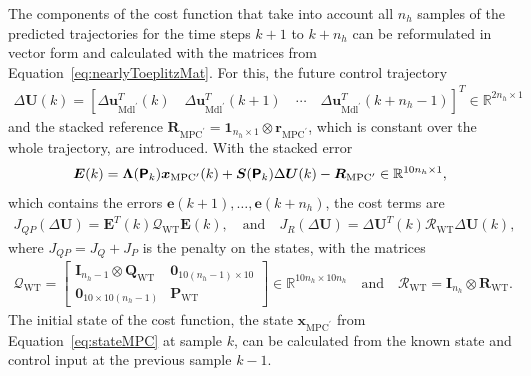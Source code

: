 The components of the cost function that take into account all $n_h$ samples of the predicted trajectories for the time steps $k+1$ to $k + n_h$ can be reformulated in vector form and calculated with the matrices from Equation~\eqref{eq:nearlyToeplitzMat}. For this, the future control trajectory
\begin{align*}
    \Delta \bm{U}(k) = \left[\Delta \bm{u}_{\text{Mdl}^\prime}^T(k) \quad \Delta \bm{u}_{\text{Mdl}^\prime}^T(k+1) \quad \cdots \quad \Delta \bm{u}_{\text{Mdl}^\prime}^T(k+ n_h -1) \right]^T \in \mathbb{R}^{2n_h \times 1}
\end{align*}
and the stacked reference $\bm{R}_{\text{MPC}^\prime} = \bm{1}_{n_h \times 1}\otimes \bm{r}_{\text{MPC}^\prime}$, which is constant over the whole trajectory, are introduced. With the stacked error
\begin{align*}
    \bm{E}(k) = \bm{\Lambda}(\bm{\mathsf{P}}_k)\bm{x}_{\text{MPC}^\prime}(k) + \bm{S}(\bm{\mathsf{P}}_k) \Delta \bm{U}(k) - \bm{R}_{\text{MPC}^\prime} \in \mathbb{R}^{10 n_h \times 1},
\end{align*}
which contains the errors $\bm{e}(k+1), \dots, \bm{e}(k+n_h)$, the cost terms are
\begin{align*}
    J_{QP}(\Delta \bm{U}) = \bm{E}^T(k) \bm{\mathcal{Q}}_{\text{WT}} \bm{E}(k),\quad \text{and} \quad
    J_R(\Delta \bm{U}) = \Delta \bm{U}^T(k) \bm{\mathcal{R}}_{\text{WT}} \Delta \bm{U}(k),
\end{align*}
where $J_{QP} = J_Q + J_P$ is the penalty on the states, with the matrices
\begin{align*}
    \bm{\mathcal{Q}}_{\text{WT}} = \begin{bmatrix} \bm{I}_{n_h -1} \otimes \bm{Q}_{\text{WT}} & \bm{0}_{10(n_h-1)\times10} \\ \bm{0}_{10\times10(n_h-1)} & \bm{P}_{\text{WT}}\end{bmatrix} \in \mathbb{R}^{10n_h \times 10n_h}\quad\text{and}\quad \bm{\mathcal{R}}_{\text{WT}} = \bm{I}_{n_h} \otimes \bm{R}_{\text{WT}}.
\end{align*}
%
The initial state of the cost function, the state $\bm{x}_{\text{MPC}^\prime}$ from Equation~\eqref{eq:stateMPC} at sample $k$, can be calculated from the known state and control input at the previous sample $k-1$. 

